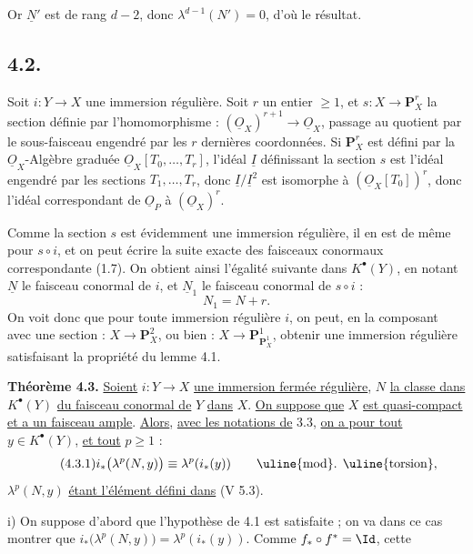
Or \(\underline{N}'\) est de
rang \(d-2\), donc \(\lambda^{d-1}(N')=0\), d'où le résultat.

\subsection*{4.2.}

Soit \(i:Y\to X\) une immersion régulière. Soit \(r\) un entier \(\ge1\), et \(s:X\longrightarrow \mathbf P_X^r\) la section définie par l'homomorphisme : \((\underline{O}_X)^{r+1}\to\underline{O}_X\), passage au quotient par le sous-faisceau engendré par les \(r\) dernières coordonnées. Si \(\mathbf P_X^r\) est défini par la \(\underline{O}_X\)-Algèbre graduée \(\underline{O}_X[T_0,\ldots,T_r]\), l'idéal \(\underline{I}\) définissant la section \(s\) est l'idéal engendré par les sections \(T_1,\ldots,T_r\), donc \(\underline{I}/\underline{I}^2\) est isomorphe à \((\underline{O}_X[T_0])^r\), donc l'idéal correspondant de \(\underline{O}_P\) à \((\underline{O}_X)^r\).

Comme la section \(s\) est évidemment une immersion régulière, il en est de même pour \(s\circ i\), et on peut écrire la suite exacte des faisceaux conormaux correspondante (1.7). On obtient ainsi l'égalité suivante dans \(K^{\bullet}(Y)\), en notant \(\underline{N}\) le faisceau conormal de \(i\), et \(\underline{N}_1\) le faisceau conormal de \(s\circ i\) :
\[
  N_1=N+r.
\]
On voit donc que pour toute immersion régulière \(i\), on peut, en la composant avec une section : \(X\to\mathbf P_X^2\), ou bien : \(X\to\mathbf P_{\mathbf P_X^1}^{1}\), obtenir une immersion régulière satisfaisant la propriété du lemme 4.1.

\textbf{Théorème 4.3.} \uline{Soient} \(i:Y\to X\) \uline{une immersion fermée régulière}, \(N\) \uline{la classe dans} \(K^{\bullet}(Y)\) \uline{du faisceau conormal de} \(Y\) \uline{dans} \(X\). \uline{On suppose que} \(X\) \uline{est quasi-compact et a un faisceau ample}. \uline{Alors}, \uline{avec les notations de} 3.3, \uline{on a pour tout} \(y\in K^{\bullet}(Y)\), \uline{et tout} \(p\ge1\) :
\begin{equation}\tag{4.3.1}
 i_*\bigl(\lambda^p(N,y)\bigr)\equiv \lambda^p(i_*(y))
 \qquad\text{\uline{mod}. \uline{torsion}},
\end{equation}
\(\lambda^p(N,y)\) \uline{étant l'élément défini dans} (V 5.3).

i) On suppose d'abord que l'hypothèse de 4.1 est satisfaite ; on va dans ce cas montrer que \(i_*\bigl(\lambda^p(N,y)\bigr)=\lambda^p(i_*(y))\). Comme \(f_*\circ f^*=\Id\), cette
